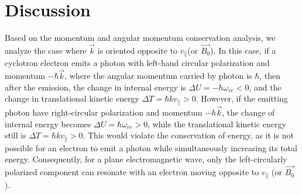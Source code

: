 \documentclass{cpbtex3}
\begin{document}
\section{Discussion }
Based on the momentum and angular momentum conservation analysis, we analyze the case where $\vec{k}$ is oriented opposite to $v_{\parallel}$(or $\vec{B_0}$). In this case, if a cyclotron electron emits a photon with left-hand circular polarization and momentum $-\hbar\vec{k}$, where the angular momentum carried by photon is $\hbar$, then after the emission, the change in internal energy is $\Delta U = -\hbar\omega_{ce}<0$, and the change in translational kinetic energy $\Delta T = \hbar k v_{\parallel}>0$. However, if the emitting photon have right-circular polarization and momentum $-\hbar\vec{k}$, the change of internal energy becomes $\Delta U = \hbar\omega_{ce}>0$, while the translational kinetic energy still is $\Delta T = \hbar k v_{\parallel}>0$. This would violate the conservation of energy, as it is not possible for an electron to emit a photon while simultaneously increasing its total energy. Consequently, for a plane electromagnetic wave, only the left-circularly polarized component can resonate with an electron moving opposite to $v_{\parallel}$ (or $\vec{B_0}$). 
%
%
\end{document}
